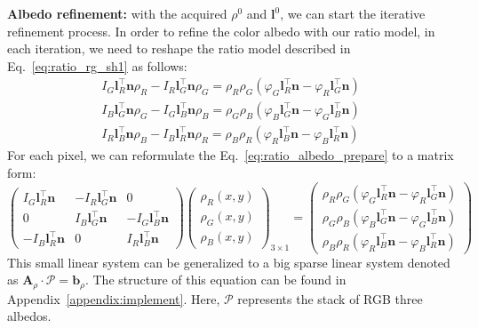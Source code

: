 \textbf{Albedo refinement:}
with the acquired $\rho^{0}$ and $\mathbf{l}^{0}$, we can start the iterative refinement process.
In order to refine the color albedo with our ratio model, in each iteration, we need to reshape the ratio model described in Eq.~\ref{eq:ratio_rg_sh1} as follows:
\begin{equation}\label{eq:ratio_albedo_prepare}
\begin{split}
I_G \mathbf{l}_R^\top\mathbf{n} \rho_R - I_R \mathbf{l}_G^\top\mathbf{n} \rho_G  = \rho_R \rho_G (\varphi_G\mathbf{l}_R^\top \mathbf{n} - \varphi_R\mathbf{l}_G^\top \mathbf{n})\\
I_B \mathbf{l}_G^\top\mathbf{n} \rho_G - I_G \mathbf{l}_B^\top\mathbf{n} \rho_B  = \rho_G \rho_B (\varphi_B\mathbf{l}_G^\top \mathbf{n} - \varphi_G\mathbf{l}_B^\top \mathbf{n})\\
I_R \mathbf{l}_B^\top\mathbf{n} \rho_B - I_B \mathbf{l}_R^\top\mathbf{n} \rho_R  = \rho_B \rho_R (\varphi_R\mathbf{l}_B^\top \mathbf{n} - \varphi_B\mathbf{l}_R^\top \mathbf{n})
\end{split}
\end{equation}
For each pixel, we can reformulate the Eq.~\ref{eq:ratio_albedo_prepare} to a matrix form:
\begin{equation}\label{eq:rho_matrix}
    \begin{pmatrix}
        I_G \mathbf{l}_R^\top\mathbf{n} & - I_R \mathbf{l}_G^\top\mathbf{n} & 0 \\
        0 & I_B \mathbf{l}_G^\top\mathbf{n} & - I_G \mathbf{l}_B^\top\mathbf{n} \\
        - I_B \mathbf{l}_R^\top\mathbf{n} & 0 & I_R \mathbf{l}_B^\top\mathbf{n} 
    \end{pmatrix}
    \begin{pmatrix}
        \rho_R(x,y)\\
        \rho_G(x,y)\\
        \rho_B(x,y)
     \end{pmatrix}_{3 \times 1}
    =
    \begin{pmatrix}
        \rho_R \rho_G (\varphi_G\mathbf{l}_R^\top \mathbf{n} - \varphi_R\mathbf{l}_G^\top \mathbf{n})\\
        \rho_G \rho_B (\varphi_B\mathbf{l}_G^\top \mathbf{n} - \varphi_G\mathbf{l}_B^\top \mathbf{n})\\
        \rho_B \rho_R (\varphi_R\mathbf{l}_B^\top \mathbf{n} - \varphi_B\mathbf{l}_R^\top \mathbf{n})
    \end{pmatrix}
\end{equation}
This small linear system can be generalized to a big sparse linear system denoted as $\mathbf{A}_{\rho}\cdot {\mathcal{P}} = \mathbf{b}_{\rho}$.
The structure of this equation can be found in Appendix~\ref{appendix:implement}.
Here, $\mathcal{P}$ represents the stack of RGB three albedos.

